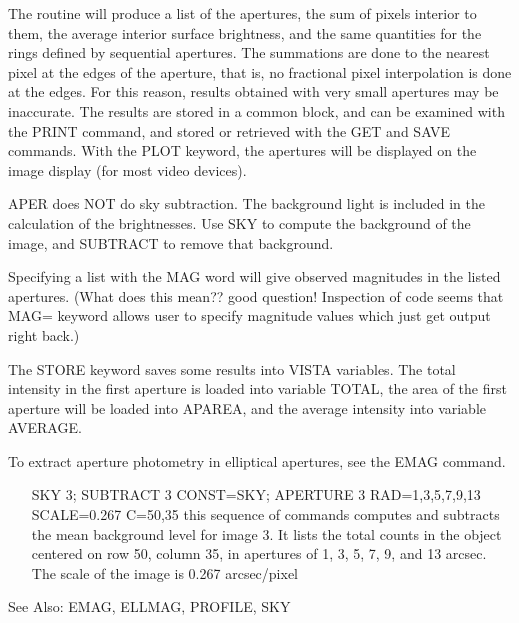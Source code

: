 The routine will produce a list of the apertures, the sum of pixels
interior to them, the average interior surface brightness, and the same
quantities for the rings defined by sequential apertures. The summations
are done to the nearest pixel at the edges of the aperture, that is, no
fractional pixel interpolation is done at the edges.  For this reason,
results obtained with very small apertures may be inaccurate.  The results
are stored in a common block, and can be examined with the PRINT command,
and stored or retrieved with the GET and SAVE commands. With the PLOT
keyword, the apertures will be displayed on the image display (for most
video devices).
 
APER does NOT do sky subtraction.  The background light is included in the
calculation of the brightnesses.  Use SKY to compute the background of the
image, and SUBTRACT to remove that background.

Specifying a list with the MAG word will give observed magnitudes in the
listed apertures. (What does this mean??  good question!  Inspection of
code seems that MAG= keyword allows user to specify magnitude values which
just get output right back.)

The STORE keyword saves some results into VISTA variables. The total
intensity in the first aperture is loaded into variable TOTAL, the area of
the first aperture will be loaded into APAREA, and the average intensity
into variable AVERAGE.

To extract aperture photometry in elliptical apertures, see the EMAG
command.

\begin{itemize}
  \item[SKY 3; SUBTRACT 3 CONST=SKY; APERTURE 3 RAD=1,3,5,7,9,13
       SCALE=0.267 C=50,35\hfill]{this sequence of commands computes and
       subtracts the mean background level for image 3.  It lists the total
       counts in the object centered on row 50, column 35, in apertures of
       1, 3, 5, 7, 9, and 13 arcsec.  The scale of the image is 0.267
       arcsec/pixel}
\end{itemize}

See Also: EMAG, ELLMAG, PROFILE, SKY


